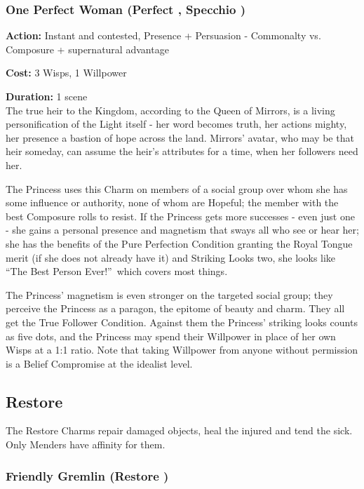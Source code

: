 \subsubsection*{One Perfect Woman (Perfect \textbullet\textbullet\textbullet\textbullet\textbullet, Specchio \textbullet\textbullet\textbullet\textbullet)}

\noindent \textbf{Action:} Instant and contested, Presence + Persuasion - Commonalty vs. Composure + supernatural advantage

\noindent \textbf{Cost:} 3 Wisps, 1 Willpower

\noindent \textbf{Duration:} 1 scene \\
 
\noindent The true heir to the Kingdom, according to the Queen of Mirrors, is a living personification of the Light itself - her word becomes truth, her actions mighty, her presence a bastion of hope across the land. Mirrors' avatar, who may be that heir someday, can assume the heir's attributes for a time, when her followers need her.

The Princess uses this Charm on members of a social group over whom she has some influence or authority, none of whom are Hopeful; the member with the best Composure rolls to resist. If the Princess gets more successes - even just one - she gains a personal presence and magnetism that sways all who see or hear her; she has the benefits of the Pure Perfection Condition granting the Royal Tongue merit (if she does not already have it) and Striking Looks two, she looks like \textquotedblleft The Best Person Ever!\textquotedblright\, which covers most things. 

The Princess' magnetism is even stronger on the targeted social group; they perceive the Princess as a paragon, the epitome of beauty and charm. They all get the True Follower Condition. Against them the Princess' striking looks counts as five dots, and the Princess may spend their Willpower in place of her own Wisps at a 1:1 ratio. Note that taking Willpower from anyone without permission is a Belief Compromise at the idealist level.

\subsection*{Restore}
\label{subsec:Restore}
The Restore Charms repair damaged objects, heal the injured and tend the sick. Only Menders have affinity for them.
\subsubsection*{Friendly Gremlin (Restore \textbullet)}

